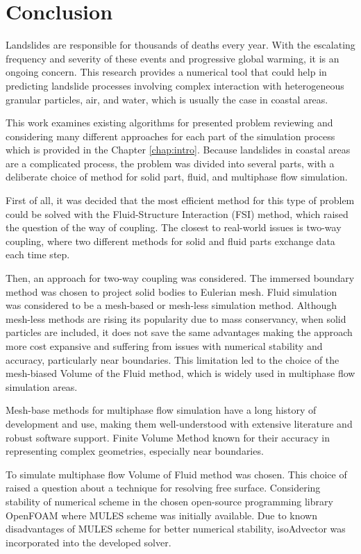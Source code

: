 \chapter{Conclusion} \label{chap:conclusion}
Landslides are responsible for thousands of deaths every year. With the escalating frequency and severity of these events and progressive global warming, it is an ongoing concern. This research provides a numerical tool that could help in predicting landslide processes involving complex interaction with heterogeneous granular particles, air, and water, which is usually the case in coastal areas. 

This work examines existing algorithms for presented problem reviewing and considering many different approaches for each part of the simulation process which is provided in the Chapter \ref{chap:intro}. Because landslides in coastal areas are a complicated process, the problem was divided into several parts, with a deliberate choice of method for solid part, fluid, and multiphase flow simulation.

First of all, it was decided that the most efficient method for this type of problem could be solved with the Fluid-Structure Interaction (FSI) method, which raised the question of the way of coupling. The closest to real-world issues is two-way coupling, where two different methods for solid and fluid parts exchange data each time step.

Then, an approach for two-way coupling was considered. The immersed boundary method was chosen to project solid bodies to Eulerian mesh. Fluid simulation was considered to be a mesh-based or mesh-less simulation method. Although mesh-less methods are rising its popularity due to mass conservancy, when solid particles are included, it does not save the same advantages making the approach more cost expansive and suffering from issues with numerical stability and accuracy, particularly near boundaries. This limitation led to the choice of the mesh-biased Volume of the Fluid method, which is widely used in multiphase flow simulation areas.

Mesh-base methods for multiphase flow simulation  have a long history of development and use, making them well-understood with extensive literature and robust software support. Finite Volume Method known for their accuracy in representing complex geometries, especially near boundaries. 

To simulate multiphase flow Volume of Fluid method was chosen. This choice of raised a question about a technique for resolving free surface. Considering stability of numerical scheme in the chosen open-source programming library OpenFOAM where MULES scheme was initially available. Due to known disadvantages of MULES scheme for better numerical stability, isoAdvector was incorporated into the developed solver.

